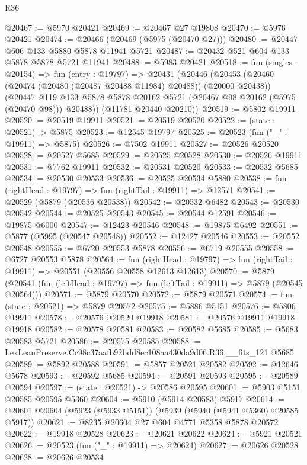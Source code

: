 \begin{lexlean}{R36}
\begin{coremodule}
@20467 := @5970 @20421
@20469 := @20467 @27 @19808
@20470 := @5976 @20421
@20474 := @20466 (@20469 (@5975 (@20470 @27)))
@20480 := @20447 @606 @133 @5880 @5878 @11941 @5721
@20487 := @20432 @521 @604 @133 @5878 @5878 @5721 @11941
@20488 := @5983 @20421
@20518 := fun (singles : @20154) =>
  fun (entry : @19797) =>
  @20431
    (@20446
      (@20453
        (@20460 (@20474 (@20480 (@20487 @20488 @11984) @20488)) (@20000 @20438))
        (@20447 @119 @133 @5878 @5878 @20162 @5721 (@20467 @98 @20162 (@5975 (@20470 @98))) @20488))
      (@11781 @20440 @20210))
@20519 := @5802 @19911
@20520 := @20519 @19911
@20521 := @20519 @20520
@20522 := (state : @20521) -> @5875
@20523 := @12545 @19797
@20525 := @20523 (fun ("_" : @19911) => @5875)
@20526 := @7502 @19911
@20527 := @20526 @20520
@20528 := @20527 @5685
@20529 := @20525 @20528
@20530 := @20526 @19911
@20531 := @7762 @19911
@20532 := @20531 @20520
@20533 := @20532 @5685
@20534 := @20530 @20533
@20536 := @20525 @20534 @5880
@20538 := fun (rightHead : @19797) => fun (rightTail : @19911) => @12571
@20541 := @20529 (@5879 (@20536 @20538))
@20542 := @20532 @6482
@20543 := @20530 @20542
@20544 := @20525 @20543
@20545 := @20544 @12591
@20546 := @19875 @6000
@20547 := @12423 @20546
@20548 := @19875 @6492
@20551 := @5877 (@5995 (@20547 @20548))
@20552 := @12427 @20546
@20553 := @20552 @20548
@20555 := @6720 @20553 @5878
@20556 := @6719 @20555
@20558 := @6727 @20553 @5878
@20564 := fun (rightHead : @19797) =>
  fun (rightTail : @19911) => @20551 (@20556 @20558 @12613 @12613)
@20570 := @5879
    (@20541 (fun (leftHead : @19797) => fun (leftTail : @19911) => @5879 (@20545 @20564)))
@20571 := @5879 @20570
@20572 := @5879 @20571
@20574 := fun (state : @20521) => @5879 @20572
@20575 := @5886 @5151
@20576 := @5806 @19911
@20578 := @20576 @20520 @19918
@20581 := @20576 @19911 @19918 @19918
@20582 := @20578 @20581
@20583 := @20582 @5685
@20585 := @5683 @20583 @5721
@20586 := @20575 @20585
@20588 := LexLeanPreserve.Cc98c37aafb92bdd8ec108aa430da9d06.R36.__fits_121 @5685
@20589 := @5892 @20588
@20591 := @5857 @20521 @20582
@20592 := @12646 @5678
@20593 := @20592 @5685
@20594 := @20591 @20593
@20595 := @20589 @20594
@20597 := (state : @20521) -> @20586 @20595
@20601 := @5903 @5151 @20585 @20595 @5360
@20604 := @5910 (@5914 @20583) @5917
@20614 := @20601 @20604 (@5923 (@5933 @5151)) (@5939 (@5940 (@5941 @5360) @20585 @5917))
@20621 := @8235 @20604 @27 @604 @4771 @5358 @5878 @20572
@20622 := @19918 @20528
@20623 := @20621 @20622
@20624 := @5921 @20521
@20626 := @20523 (fun ("_" : @19911) => @20624)
@20627 := @20626 @20528
@20628 := @20626 @20534

\end{coremodule}
\end{lexlean}
